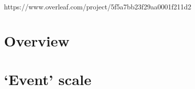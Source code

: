 \documentclass{dune} %
\begin{document}
\pagestyle{titlepage}
%
\cleardoublepage


\cleardoublepage

% 


https://www.overleaf.com/project/5f5a7bb23f29aa0001f211d2







\part{Overview} %
\label{part:overview}

\cleardoublepage

%


\part{`Event' scale}\label{part:event} %
\end{document}
